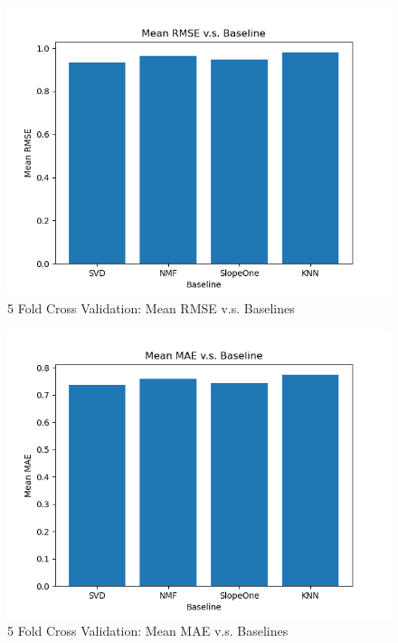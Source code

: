 \documentclass{article}
\begin{document}
\begin{figure}[H]
    \centering
    \includegraphics[width=.8\textwidth]{figs/rmse-baselines.png}
    \caption{5 Fold Cross Validation: Mean RMSE v.s. Baselines}
    \label{fig:rmse-baselines}
\end{figure}

\begin{figure}[H]
    \centering
    \includegraphics[width=.8\textwidth]{figs/mae-baselines.png}
    \caption{5 Fold Cross Validation: Mean MAE v.s. Baselines}
    \label{fig:mae-baselines}
\end{figure}
\end{document}
